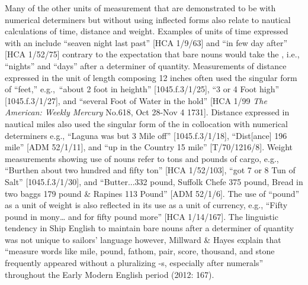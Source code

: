 Many of the other units of measurement that are demonstrated to be  with numerical determiners but without using inflected  forms also relate to nautical calculations of time, distance and weight. Examples of units of time expressed with an   include “seaven night last past” [HCA 1/9/63] and “in few day after” [HCA 1/52/75] contrary to the expectation that bare nouns would take the , i.e., “nights” and “days” after a determiner of quantity. Measurements of distance expressed in the unit of length composing 12 inches often used the singular form of “feet,” e.g.,~“about 2 foot in heighth” [1045.f.3/1/25], “3 or 4 Foot high” [1045.f.3/1/27], and “several Foot of Water in the hold” [HCA 1/99 \textit{The American: Weekly Mercury} No.618, Oct 28-Nov 4 1731]. Distance expressed in nautical miles also used the singular form of the  in collocation with numerical determiners e.g., “Laguna was but 3 Mile off” [1045.f.3/1/18], “Dist[ance] 196 mile” [ADM 52/1/11], and “up in the Country 15 mile” [T/70/1216/8]. Weight measurements showing use of  nouns refer to tons and pounds of cargo, e.g., “Burthen about two hundred and fifty ton” [HCA 1/52/103], “got 7 or 8 Tun of Salt” [1045.f.3/1/30], and “Butter...332 pound, Suffolk Chefe 375 pound, Bread in two baggs 179 pound \& Rapines 113 Pound” [ADM 52/1/6]. The use of  “pound” as a unit of weight is also reflected in its use as a unit of currency, e.g., “Fifty pound in mony… and for fifty pound more” [HCA 1/14/167]. The linguistic tendency in Ship English to maintain  bare nouns after a determiner of quantity was not unique to sailors’ language however, Millward \& Hayes explain that “measure words like mile, pound, fathom, pair, score, thousand, and stone frequently appeared without a pluralizing -s, especially after numerals” throughout the Early Modern English period (2012: 167).

